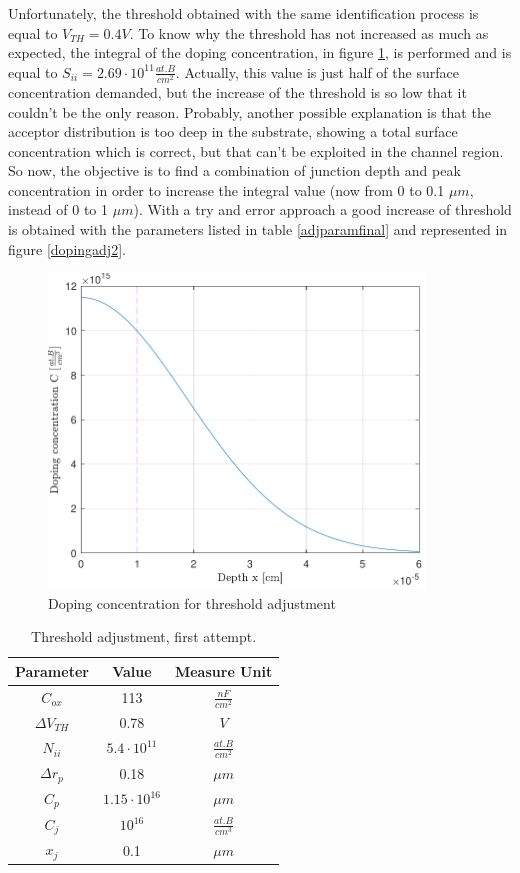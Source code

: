 \documentclass[11pt,a4paper]{article}
\begin{document}
	Unfortunately, the threshold obtained with the same identification process is equal to $V_{TH} = 0.4V$. To know why the threshold has not increased as much as expected, the integral of the doping concentration, in figure \ref*{dopingadj1}, is performed and is equal to $S_{ii} = 2.69 \cdot 10^{11} \frac{at.B}{cm^2}$. Actually, this value is just half of the surface concentration demanded, but the increase of the threshold is so low that it couldn't be the only reason. Probably, another possible explanation is that the acceptor distribution is too deep in the substrate, showing a total surface concentration which is correct, but that can't be exploited in the channel region. So now, the objective is to find a combination of junction depth and peak concentration in order to increase the integral value (now from 0 to 0.1 $\mu m$, instead of 0 to 1 $\mu m$). With a try and error approach a good increase of threshold is obtained with the parameters listed in table \ref*{adjparamfinal} and represented in figure \ref*{dopingadj2}.
	\begin{figure}
		\centering
		\includegraphics[width=100mm]{dopingadj1}
		\caption{Doping concentration for threshold adjustment}
		\label{dopingadj1}
	\end{figure}	
		\begin{table}
		\caption{Threshold adjustment, first attempt.}
		\centering
		\begin{tabular}[H]{|| c | c | c ||}
			\hline
			Parameter & Value & Measure Unit \\ [0.5ex] 
			\hline\hline
			$C_{ox}$ & 113 & $\frac{nF}{cm^2}$\\
			\hline
			$\Delta V_{TH}$ & 0.78 & $V$\\
			\hline
			$N_{ii}$ & $ 5.4\cdot 10^{11}$ & $\frac{at.B}{cm^2}$\\
			\hline			
			$\Delta r_p$ & 0.18 & $\mu m$\\
			\hline		
			$C_p$ & $1.15\cdot10^{16}$ & $\mu m$\\
			\hline		
			$C_j$ & $10^{16}$ & $\frac{at.B}{cm^3}$\\
			\hline			
			$x_j$ & 0.1 & $\mu m$\\
			\hline			
		\end{tabular}
		\label{adjparam}
	\end{table}
\end{document}
